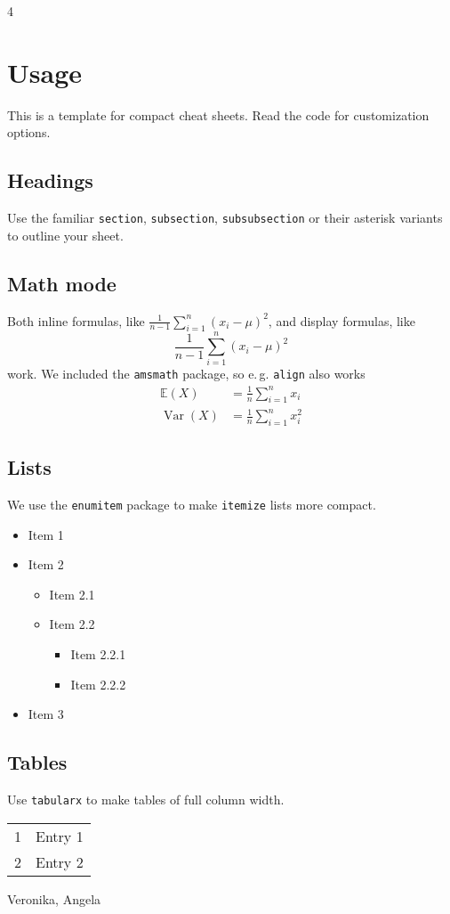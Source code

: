 \documentclass[%
  a4paper,     %
  landscape,   %
  english,     %
  7pt,         %
  fleqn        %
]{scrartcl}
\begin{document}
\begin{multicols*}{%
  4 %
}

\section*{Usage}

This is a template for compact cheat sheets. Read the code for customization options.

\subsection*{Headings}

Use the familiar \texttt{section}, \texttt{subsection}, \texttt{subsubsection} or their asterisk variants to outline your sheet.

\subsection*{Math mode}

Both inline formulas, like $\frac{1}{n-1} \sum_{i=1}^n (x_i - \mu)^2$, and display formulas, like
\[
  \frac{1}{n-1}\sum_{i=1}^n (x_i - \mu)^2
\]
work. We included the \texttt{amsmath} package, so e.\,g. \texttt{align} also works
\begin{align*}
  \mathbb E(X) &= \frac{1}{n} \sum_{i=1}^n x_i\\
  \operatorname{Var}(X) &= \frac{1}{n} \sum_{i=1}^n x_i^2
\end{align*}

\subsection*{Lists}

We use the \texttt{enumitem} package to make \texttt{itemize} lists more compact.

\begin{itemize}
  \item Item 1
  \item Item 2
  \begin{itemize}
    \item Item 2.1
    \item Item 2.2
    \begin{itemize}
      \item Item 2.2.1
      \item Item 2.2.2
    \end{itemize}
  \end{itemize}
  \item Item 3
\end{itemize}

\subsection*{Tables}

Use \texttt{tabularx} to make tables of full column width.

\begin{tabularx}{\columnwidth}{|c|X|}
  \hline
  1 & Entry 1\\
  2 & Entry 2\\
  \hline
\end{tabularx}


\end{multicols*}

Veronika, Angela
\end{document}
